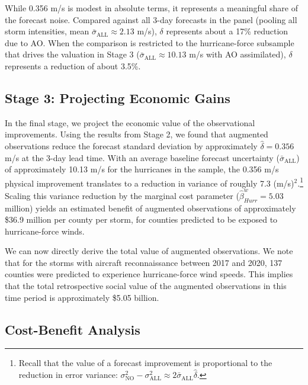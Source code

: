 \documentclass[12pt]{article}%
\begin{document}
While 0.356 m/s is modest in absolute terms, it represents a meaningful share of the forecast noise. Compared against all 3-day forecasts in the panel (pooling all storm intensities, mean $\bar{\sigma}_{\text{ALL}} \approx 2.13$ m/s), $\delta$ represents about a 17\% reduction due to AO. When the comparison is restricted to the hurricane-force subsample that drives the valuation in Stage 3 ($\bar{\sigma}_{\text{ALL}} \approx 10.13$ m/s with AO assimilated), $\delta$ represents a reduction of about 3.5\%.



\subsection{Stage 3: Projecting Economic Gains}

In the final stage, we project the economic value of the observational improvements. Using the results from Stage 2, we found that augmented observations reduce the forecast standard deviation by approximately $\hat{\delta} = 0.356$ m/s at the 3-day lead time. With an average baseline forecast uncertainty ($\bar{\sigma}_{\text{ALL}}$) of approximately 10.13 m/s for the hurricanes in the sample, the 0.356 m/s physical improvement translates to a reduction in variance of roughly 7.3 (m/s)$^2$.\footnote{Recall that the value of a forecast improvement is proportional to the reduction in error variance: $\sigma_{\text{NO}}^{2} - \sigma_{\text{ALL}}^{2} \approx 2\bar{\sigma}_{\text{ALL}}\hat{\delta}$.} Scaling this variance reduction by the marginal cost parameter ($\hat{\beta}^w_{Hurr} = 5.03$ million) yields an estimated benefit of augmented observations of approximately \$36.9 million per county per storm, for counties predicted to be exposed to hurricane-force winds.

We can now directly derive the total value of augmented observations. We note that for the storms with aircraft reconnaissance between 2017 and 2020, 137 counties were predicted to experience hurricane-force wind speeds. This implies that the total retrospective social value of the augmented observations in this time period is approximately \$5.05 billion.

\subsection{Cost-Benefit Analysis}
\end{document}
